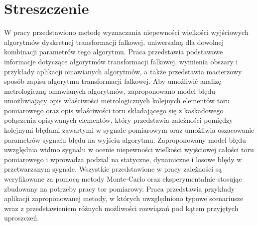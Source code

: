 \chapter*{Streszczenie}

W pracy przedstawiono metodę wyznaczania niepewności wielkości wyjściowych algorytmów dyskretnej transformacji falkowej, uniwersalną dla dowolnej kombinacji parametrów tego algorytmu. Praca przedstawia podstawowe informacje dotyczące algorytmów transformacji falkowej, wymienia obszary i przykłady aplikacji omawianych algorytmów, a także przedstawia macierzowy sposób zapisu algorytmu transformacji falkowej. Aby umożliwić analizę metrologiczną omawianych algorytmów, zaproponowano model błędu umożliwiający opis właściwości metrologicznych kolejnych elementów toru pomiarowego oraz opis właściwości toru składającego się z kaskadowego połączenia opisywanych elementów, który przedstawia zależności pomiędzy kolejnymi błędami zawartymi w sygnale pomiarowym oraz umożliwia oszacowanie parametrów sygnału błędu na wyjściu algorytmu. Zaproponowany model błędu uwzględnia widmo sygnału w ocenie niepewności wielkości wyjściowej całości toru pomiarowego i wprowadza podział na statyczne, dynamiczne i losowe błędy w przetwarzanym sygnale. Wszystkie przedstawione w pracy zależności są weryfikowane za pomocą metody Monte-Carlo oraz eksperymentalnie stosując zbudowany na potrzeby pracy tor pomiarowy. Praca przedstawia przykłady aplikacji zaproponowanej metody, w których uwzględniono typowe scenariusze wraz z przedstawieniem różnych możliwości rozwiązań pod kątem przyjętych uproszczeń.

